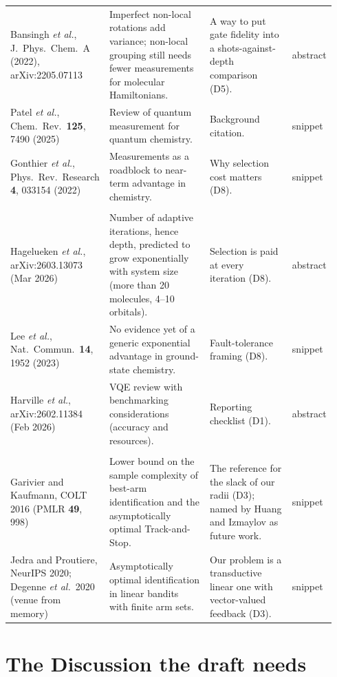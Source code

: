 \documentclass[11pt]{article}
\begin{document}
\begin{longtable}{>{\raggedright\arraybackslash}p{0.27\linewidth}>{\raggedright\arraybackslash}p{0.33\linewidth}>{\raggedright\arraybackslash}p{0.27\linewidth}>{\raggedright\arraybackslash}p{0.07\linewidth}}
Bansingh \emph{et al.}, J.\ Phys.\ Chem.\ A (2022), arXiv:2205.07113 & Imperfect non-local rotations add variance; non-local grouping still needs fewer measurements for molecular Hamiltonians. & A way to put gate fidelity into a shots-against-depth comparison (D5). & abstract \\
Patel \emph{et al.}, Chem.\ Rev.\ \textbf{125}, 7490 (2025) & Review of quantum measurement for quantum chemistry. & Background citation. & snippet \\
Gonthier \emph{et al.}, Phys.\ Rev.\ Research \textbf{4}, 033154 (2022) & Measurements as a roadblock to near-term advantage in chemistry. & Why selection cost matters (D8). & snippet \\
\midrule
\multicolumn{4}{l}{\emph{Scaling and context}} \\
Hagelueken \emph{et al.}, arXiv:2603.13073 (Mar 2026) & Number of adaptive iterations, hence depth, predicted to grow exponentially with system size (more than 20 molecules, 4--10 orbitals). & Selection is paid at every iteration (D8). & abstract \\
Lee \emph{et al.}, Nat.\ Commun.\ \textbf{14}, 1952 (2023) & No evidence yet of a generic exponential advantage in ground-state chemistry. & Fault-tolerance framing (D8). & snippet \\
Harville \emph{et al.}, arXiv:2602.11384 (Feb 2026) & VQE review with benchmarking considerations (accuracy and resources). & Reporting checklist (D1). & abstract \\
\midrule
\multicolumn{4}{l}{\emph{Bandit theory}} \\
Garivier and Kaufmann, COLT 2016 (PMLR \textbf{49}, 998) & Lower bound on the sample complexity of best-arm identification and the asymptotically optimal Track-and-Stop. & The reference for the slack of our radii (D3); named by Huang and Izmaylov as future work. & snippet \\
Jedra and Proutiere, NeurIPS 2020; Degenne \emph{et al.}\ 2020 (venue from memory) & Asymptotically optimal identification in linear bandits with finite arm sets. & Our problem is a transductive linear one with vector-valued feedback (D3). & snippet \\
\bottomrule
\end{longtable}
\endgroup

\section{The Discussion the draft needs}
\label{sec:plan}
\end{document}

